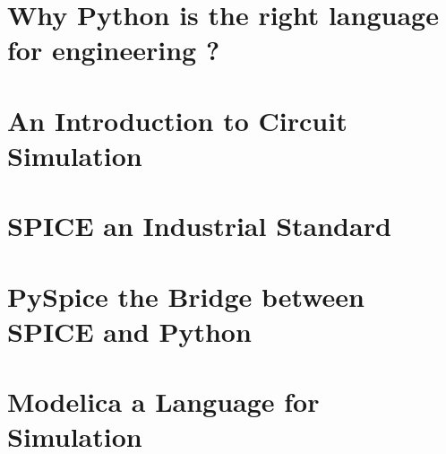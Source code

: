 
\frame{%
\tableofcontents
\note{
}
}

%
%

% 

\section{Why Python is the right language for engineering ?}

\section{An Introduction to Circuit Simulation}


\section{SPICE an Industrial Standard}



\section{PySpice the Bridge between SPICE and Python}



\section{Modelica a Language for Simulation}




